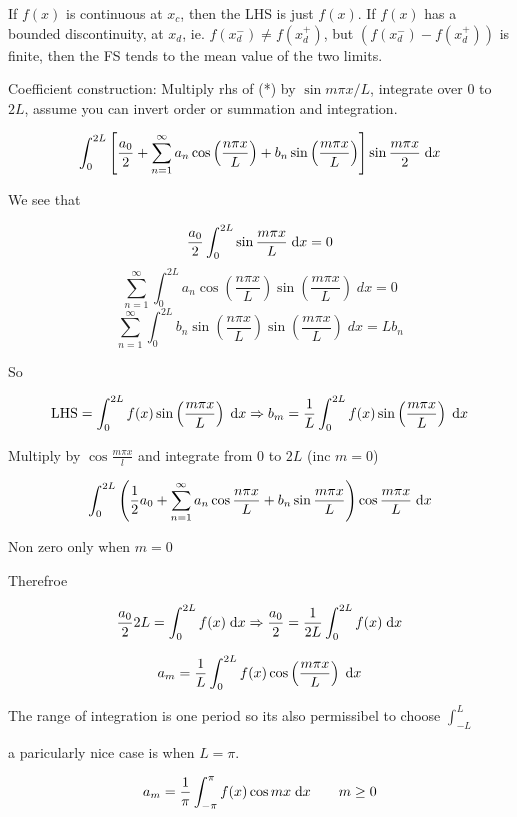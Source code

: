 \documentclass[a4paper]{article}
\begin{document}
If $ f(x) $ is continuous at $ x_{c} $, then the LHS is just $ f(x) $. If $ f(x) $ has a bounded discontinuity, at $ x_{d} $, ie. $ f(x_{d}^{-}) \neq f(x_{d}^{+})$, but $ (f(x_{d}^{-}) - f(x_{d}^{+})) $ is finite, then the FS tends to the mean value of the two limits. 

Coefficient construction:
Multiply rhs of (*) by $ \sin m \pi x / L $, integrate over $ 0 $ to $ 2L $, assume you can invert order or summation and integration.

\begin{align*}
\int_{0}^{2L} \left[  \frac{a_{0}}{2} + \sum_{n=1}^{\infty} a_{n} \cos \left( \frac{n \pi x}{L} \right) + b_{n} \sin \left( \frac{m \pi x}{L} \right) \right] \sin \frac{m \pi x}{2} \; \mathrm{d} x
\end{align*}

We see that


\[ \frac{a_{0}}{2}\int_{0}^{2L} \sin \frac{m \pi x}{L} \; \mathrm{d} x = 0 \]
\[ \sum_{n=1}^{\infty} \int_{0}^{2L} a_{n} \cos \left( \frac{n \pi x}{L} \right) \sin \left( \frac{m \pi x}{L} \right) \; d x = 0 \]
\[ \sum_{n=1}^{\infty}  \int_{0}^{2L} b_{n} \sin \left( \frac{n \pi x}{L} \right) \sin \left( \frac{m \pi x}{L} \right) \; d x = Lb_{n} \]

So 

\[ \text{LHS} = \int_{0}^{2L} f(x) \sin \left( \frac{m \pi x}{L} \right)  \; \mathrm{d} x \Rightarrow b_{m} = \frac{1}{L} \int_{0}^{2L} f(x) \sin \left( \frac{m \pi x}{L} \right) \; \mathrm{d} x \]


Multiply by $ \cos \frac{m \pi x}{l} $ and integrate from $ 0 $ to $ 2L $ (inc $ m = 0 $)


\[ \int_{0}^{2L} \left( \frac{1}{2} a_{0} + \sum_{n=1}^{\infty} a_{n} \cos \frac{n \pi x}{L}  + b_{n} \sin \frac{m \pi x}{L}\right) \cos \frac{m \pi x}{L} \; \mathrm{d} x \]

Non zero only when $ m = 0 $

Therefroe 

\[ \frac{a_{0}}{2} 2L = \int_{0}^{2L} f(x) \; \mathrm{d} x \Rightarrow \frac{a_{0}}{2} = \frac{1}{2L} \int_{0}^{2L} f(x) \; \mathrm{d} x \]

\[ a_{m} = \frac{1}{L} \int_{0}^{2L} f(x) \cos \left(  \frac{m \pi x}{L}  \right) \; \mathrm{d} x  \]

The range of integration is one period so its also permissibel to choose $ \int_{-L}^{L} $

a paricularly nice case is when $ L = \pi $.

\[ a_{m}  = \frac{1}{\pi} \int_{-\pi}^{\pi} f(x) \cos m x \; \mathrm{d} x \qquad m \geq 0 \]
\end{document}
